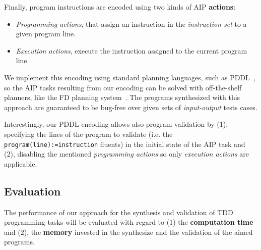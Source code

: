 \documentclass[10pt,a4paper]{paper}
\begin{document}
Finally, program instructions are encoded using two kinds of AIP {\bf actions}:
\begin{itemize}
\item {\it Programming actions}, that assign an instruction in the {\em instruction set} to a given program line.
\item {\it Execution actions}, execute the instruction assigned to the current program line.
\end{itemize}
We implement this encoding using standard planning languages, such as PDDL~\cite{fox2003pddl2}, so the AIP tasks resulting from our encoding can be solved with off-the-shelf planners, like the {\sc FD} planning system~\cite{helmert2006fast}. The programs synthesized with this approach are guaranteed to be bug-free over given sets of {\em input-output} tests cases.

Interestingly, our PDDL encoding allows also program validation by (1), specifying the lines of the program to validate (i.e. the {\tt program(line):=instruction} fluents) in the initial state of the AIP task and (2), disabling the mentioned {\it programming actions} so only {\it execution actions} are applicable.


\subsection{Evaluation}
\label{sec:evaluation}

The performance of our approach for the synthesis and validation of TDD programming tasks will be evaluated with regard to (1) the {\bf computation time} and (2), the {\bf memory} invested in the synthesize and the validation of the aimed programs.
\end{document}
